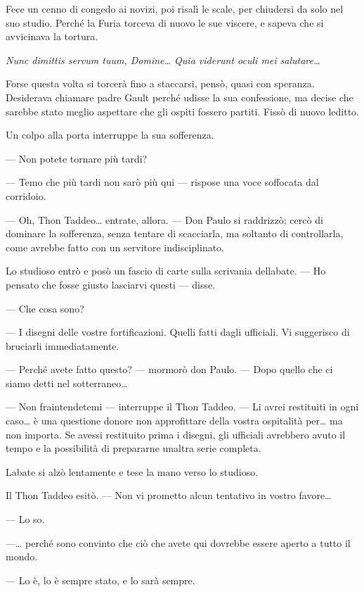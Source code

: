 Fece un cenno di congedo ai novizi, poi risalì le scale, per chiudersi
da solo nel suo studio. Perché la Furia torceva di nuovo le sue viscere,
e sapeva che si avvicinava la tortura.

\emph{Nunc dimittis servum tuum, Domine\ldots{} Quia viderunt oculi mei
	salutare\ldots{}}

Forse questa volta si torcerà fino a staccarsi, pensò, quasi con
speranza. Desiderava chiamare padre Gault perché udisse la sua
confessione, ma decise che sarebbe stato meglio aspettare che gli ospiti
fossero partiti. Fissò di nuovo l\textquotesingle editto.

Un colpo alla porta interruppe la sua sofferenza.

--- Non potete tornare più tardi?

--- Temo che più tardi non sarò più qui --- rispose una voce soffocata
dal corridoio.

--- Oh, Thon Taddeo\ldots{} entrate, allora. --- Don Paulo si raddrizzò;
cercò di dominare la sofferenza, senza tentare di scacciarla, ma
soltanto di controllarla, come avrebbe fatto con un servitore
indisciplinato.

Lo studioso entrò e posò un fascio di carte sulla scrivania
dell\textquotesingle abate. --- Ho pensato che fosse giusto lasciarvi
questi --- disse.

--- Che cosa sono?

--- I disegni delle vostre fortificazioni. Quelli fatti dagli ufficiali.
Vi suggerisco di bruciarli immediatamente.

--- Perché avete fatto questo? --- mormorò don Paulo. --- Dopo quello
che ci siamo detti nel sotterraneo\ldots{}

--- Non fraintendetemi --- interruppe il Thon Taddeo. --- Li avrei
restituiti in ogni caso\ldots{} è una questione d\textquotesingle onore
non approfittare della vostra ospitalità per\ldots{} ma non importa. Se
avessi restituito prima i disegni, gli ufficiali avrebbero avuto il
tempo e la possibilità di prepararne un\textquotesingle altra serie
completa.

L\textquotesingle abate si alzò lentamente e tese la mano verso lo
studioso.

Il Thon Taddeo esitò. --- Non vi prometto alcun tentativo in vostro
favore\ldots{}

--- Lo so.

---\ldots{} perché sono convinto che ciò che avete qui dovrebbe essere
aperto a tutto il mondo.

--- Lo è, lo è sempre stato, e lo sarà sempre.

